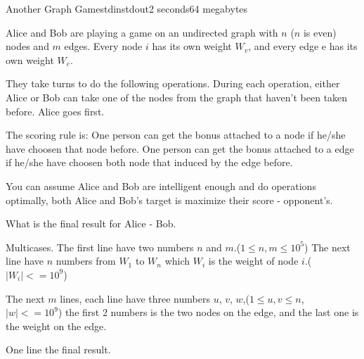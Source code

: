 \begin{problem}{Another Graph Game}{stdin}{stdout}{2 seconds}{64 megabytes}

Alice and Bob are playing a game on an undirected graph with $n$ ($n$ is even) nodes and $m$  edges. Every node $i$ has its own weight $W_v$, and every edge e has its own weight $W_e$.

They take turns to do the following operations. During each operation, either Alice or Bob can take one of the nodes from the graph that haven't been taken before. Alice goes first.

The scoring rule is:
One person can get the bonus attached to a node if he/she have choosen that node before.
One person can get the bonus attached to a edge if he/she have choosen both node that induced by the edge before.

You can assume Alice and Bob are intelligent enough and do operations optimally, both Alice and Bob's target is maximize their score - opponent's.

What is the final result for Alice - Bob.

\InputFile
Multicases. The first line have two numbers $n$ and $m$.($1\leq n, m \leq 10^5$)
The next line have $n$ numbers from $W_1$ to $W_n$ which $W_i$ is the weight of node $i$.($|W_i| <= 10^9$)

The next $m$ lines, each line have three numbers $u$, $v$, $w$,($1 \leq u, v \leq n$, $|w| <= 10^9$)
the first 2 numbers is the two nodes on the edge, and the last one is the weight on the edge. 

\OutputFile
One line the final result.

\Examples

\begin{example}
%
\end{example}

\end{problem}

